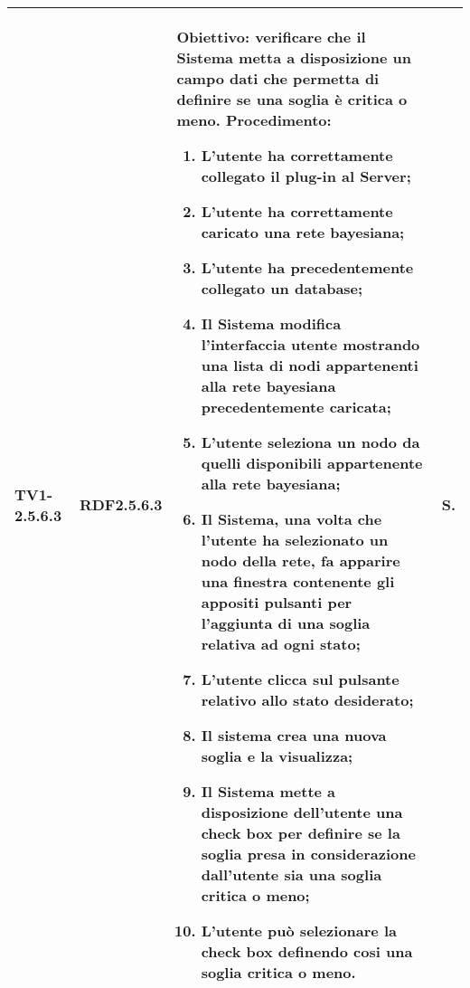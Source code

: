 \begin{longtable}{|C{.15\textwidth}|C{.13\textwidth}|m{.65\textwidth}|C{.08\textwidth}|}
TV1-2.5.6.3 & RDF2.5.6.3  &
	\textbf{Obiettivo}: verificare che il Sistema metta a disposizione un campo dati che permetta di definire se una soglia è critica o meno.  \newline
	\textbf{Procedimento}:
	\begin{enumerate}
		\item L'utente ha correttamente collegato il plug-in al Server;
		\item L'utente ha correttamente caricato una rete bayesiana;
		\item L'utente ha precedentemente collegato un database;
		\item Il Sistema modifica l'interfaccia utente mostrando una lista di nodi appartenenti alla rete bayesiana precedentemente caricata;
		\item L'utente seleziona un nodo da quelli disponibili appartenente alla rete bayesiana;
		\item Il Sistema, una volta che l'utente ha selezionato un nodo della rete, fa apparire una finestra contenente gli appositi pulsanti per l'aggiunta di una soglia relativa ad ogni stato;
		\item L'utente clicca sul pulsante relativo allo stato desiderato;
		\item Il sistema crea una nuova soglia e la visualizza;
		\item Il Sistema mette a disposizione dell'utente una check box per definire se la soglia presa in considerazione dall'utente sia una soglia critica o meno;
		\item L'utente può selezionare la check box definendo cosi una soglia critica o meno.
	\end{enumerate}
	& S. \\
\hline


\end{longtable}
